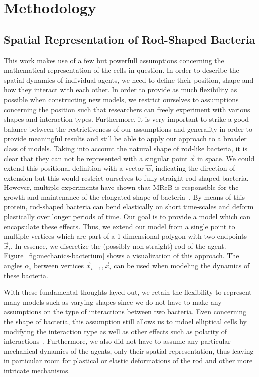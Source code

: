\documentclass{article}
\begin{document}
\section{Methodology}
\subsection{Spatial Representation of Rod-Shaped Bacteria}
\label{subsec:spatial-representation}
This work makes use of a few but powerfull assumptions concerning the mathematical representation of
the cells in question.
In order to describe the spatial dynamics of individual agents, we need to define their position,
shape and how they interact with each other.
In order to provide as much flexibility as possible when constructing new models, we restrict
ourselves to assumptions concerning the position such that researchers can freely experiment with
various shapes and interaction types.
Furthermore, it is very important to strike a good balance between the restrictiveness of our
assumptions and generality in order to provide meaningful results and still be able to apply our
approach to a broader class of models.
Taking into account the natural shape of rod-like bacteria, it is clear that they can not be
represented with a singular point $\vec{x}$ in space.
We could extend this positional definition with a vector $\vec{w}$, indicating the direction of
extension but this would restrict ourselves to fully straight rod-shaped bacteria.
However, multiple experiments have shown that MReB is responsible for the growth and maintenance of
the elongated shape of bacteria~\cite{Erickson2001}.
By means of this protein, rod-shaped bacteria can bend elastically on short time-scales and
deform plastically over longer periods of time.
Our goal is to provide a model which can encapsulate these effects.
Thus, we extend our model from a single point to multiple vertices which are part of a 1-dimensional
polygon with two endpoints $\vec{x}_i$.
In essence, we discretize the (possibly non-straight) rod of the agent.
Figure~\ref{fig:mechanics-bacterium} shows a visualization of this approach.
The angles $\alpha_i$ between vertices $\vec{x}_{i-1},\vec{x}_i$ can be used when modeling the
dynamics of these bacteria.

With these fundamental thoughts layed out, we retain the flexibility to represent many models such
as varying shapes since we do not have to make any assumptions on the type of interactions between
two bacteria.
Even concerning the shape of bacteria, this assumption still allows us to mdoel elliptical cells by
modifying the interaction type as well as other effects such as polarity of
interactions~\cite{Duvernoy2018}.
Furthermore, we also did not have to assume any particular mechanical dynamics of the agents, only
their spatial representation, thus leaving in particular room for plastical or elastic deformations
of the rod and other more intricate mechanisms.
\end{document}
